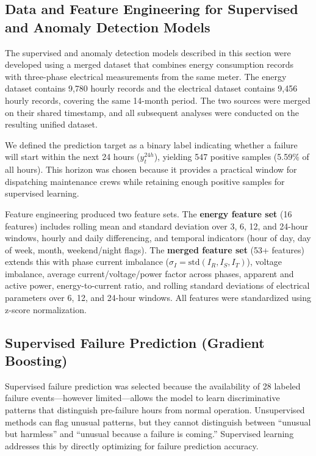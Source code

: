 \documentclass{article}
\begin{document}
\subsection{Data and Feature Engineering for Supervised and Anomaly Detection Models}

The supervised and anomaly detection models described in this section were developed using a merged dataset that combines energy consumption records with three-phase electrical measurements from the same meter. The energy dataset contains 9,780 hourly records and the electrical dataset contains 9,456 hourly records, covering the same 14-month period. The two sources were merged on their shared timestamp, and all subsequent analyses were conducted on the resulting unified dataset.

We defined the prediction target as a binary label indicating whether a failure will start within the next 24 hours ($y^{24h}_t$), yielding 547 positive samples (5.59\% of all hours). This horizon was chosen because it provides a practical window for dispatching maintenance crews while retaining enough positive samples for supervised learning.

Feature engineering produced two feature sets. The \textbf{energy feature set} (16 features) includes rolling mean and standard deviation over 3, 6, 12, and 24-hour windows, hourly and daily differencing, and temporal indicators (hour of day, day of week, month, weekend/night flags). The \textbf{merged feature set} (53+ features) extends this with phase current imbalance ($\sigma_I = \text{std}(I_R, I_S, I_T)$), voltage imbalance, average current/voltage/power factor across phases, apparent and active power, energy-to-current ratio, and rolling standard deviations of electrical parameters over 6, 12, and 24-hour windows. All features were standardized using z-score normalization.

\subsection{Supervised Failure Prediction (Gradient Boosting)}

Supervised failure prediction was selected because the availability of 28 labeled failure events---however limited---allows the model to learn discriminative patterns that distinguish pre-failure hours from normal operation. Unsupervised methods can flag unusual patterns, but they cannot distinguish between ``unusual but harmless'' and ``unusual because a failure is coming.'' Supervised learning addresses this by directly optimizing for failure prediction accuracy.
\end{document}

